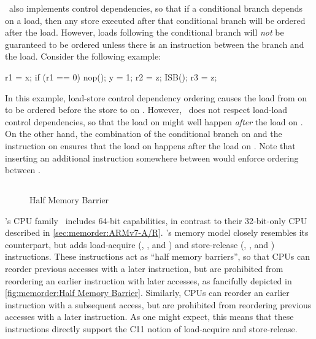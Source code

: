 \ARM\ also implements control dependencies, so that if a conditional
branch depends on a load, then any store executed after that conditional
branch will be ordered after the load.
However, loads following the conditional branch will \emph{not}
be guaranteed to be ordered unless there is an 
instruction between the branch and the load.
Consider the following example:

\begin{fcvlabel}
\begin{VerbatimN}[commandchars=\\\[\]]
r1 = x;			\lnlbl[x]
if (r1 == 0)		\lnlbl[if]
	nop();		\lnlbl[nop]
y = 1;			\lnlbl[y]
r2 = z;			\lnlbl[z1]
ISB();			\lnlbl[isb]
r3 = z;			\lnlbl[z2]
\end{VerbatimN}
\end{fcvlabel}

\begin{fcvref}
In this example, load-store control dependency ordering causes
the load from  on  to be ordered before the store to
 on .
However, \ARM\ does not respect load-load control dependencies, so that
the load on  might well happen \emph{after} the
load on .
On the other hand, the combination of the conditional branch on 
and the  instruction on  ensures that
the load on  happens after the load on .
Note that inserting an additional  instruction somewhere between
 would enforce ordering between .
\end{fcvref}

\subsection{}
\label{sec:memorder:ARMv8}

\begin{figure}
\centering
{}
\caption{Half Memory Barrier}
\end{figure}

\ARM's  CPU family~\cite{ARMv8A:2017}
includes 64-bit capabilities,
in contrast to their 32-bit-only CPU described in
\cref{sec:memorder:ARMv7-A/R}.
's memory model closely resembles its  counterpart,
but adds load-acquire (, , and )
and store-release (, , and )
instructions.
These instructions act as ``half memory barriers'', so that
 CPUs can reorder previous accesses with a later 
instruction, but are prohibited from reordering an earlier 
instruction with later accesses, as fancifully depicted in
\cref{fig:memorder:Half Memory Barrier}.
Similarly,  CPUs can reorder an earlier  instruction with
a subsequent access, but are prohibited from reordering
previous accesses with a later  instruction.
As one might expect, this means that these instructions directly support
the C11 notion of load-acquire and store-release.

